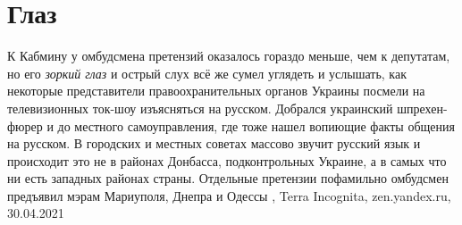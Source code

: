  
 
 
 
 
\chapter{Глаз}
\label{sec:slova.glaz}

К Кабмину у омбудсмена претензий оказалось гораздо меньше, чем к депутатам, но
его \emph{зоркий глаз} и острый слух всё же сумел углядеть и услышать, как некоторые
представители правоохранительных органов Украины посмели на телевизионных
ток-шоу изъясняться на русском.  Добрался украинский шпрехен-фюрер и до
местного самоуправления, где тоже нашел вопиющие факты общения на русском. В
городских и местных советах массово звучит русский язык и происходит это не в
районах Донбасса, подконтрольных Украине, а в самых что ни есть западных
районах страны. Отдельные претензии пофамильно омбудсмен предъявил мэрам
Мариуполя, Днепра и Одессы
, 
Terra Incognita, zen.yandex.ru, 30.04.2021

